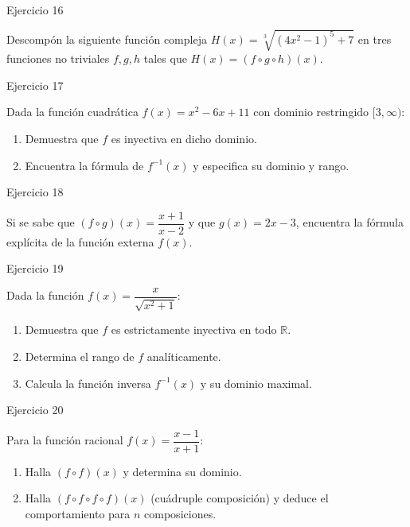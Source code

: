 \documentclass[aspectratio=169]{beamer}
\begin{document}
\begin{frame}{Ejercicio 16}
  \begin{mwejercicio}
    Descompón la siguiente función compleja $H(x) = \sqrt[3]{(4x^2 - 1)^5 + 7}$ en tres funciones no triviales $f, g, h$ tales que $H(x) = (f \circ g \circ h)(x)$.
  \end{mwejercicio}
  \vspace{3.5cm}
\end{frame}
\begin{frame}{Ejercicio 17}
  \begin{mwejercicio}
    Dada la función cuadrática $f(x) = x^2 - 6x + 11$ con dominio restringido $[3, \infty)$:
    \begin{enumerate}
      \item Demuestra que $f$ es inyectiva en dicho dominio.
      \item Encuentra la fórmula de $f^{-1}(x)$ y especifica su dominio y rango.
    \end{enumerate}
  \end{mwejercicio}
  \vspace{3.5cm}
\end{frame}
\begin{frame}{Ejercicio 18}
  \begin{mwejercicio}
    Si se sabe que $(f \circ g)(x) = \dfrac{x + 1}{x - 2}$ y que $g(x) = 2x - 3$, encuentra la fórmula explícita de la función externa $f(x)$.
  \end{mwejercicio}
  \vspace{3.5cm}
\end{frame}
\begin{frame}{Ejercicio 19}
  \begin{mwejercicio}
    Dada la función $f(x) = \dfrac{x}{\sqrt{x^2 + 1}}$:
    \begin{enumerate}
      \item Demuestra que $f$ es estrictamente inyectiva en todo $\mathbb{R}$.
      \item Determina el rango de $f$ analíticamente.
      \item Calcula la función inversa $f^{-1}(x)$ y su dominio maximal.
    \end{enumerate}
  \end{mwejercicio}
  \vspace{3.5cm}
\end{frame}
\begin{frame}{Ejercicio 20}
  \begin{mwejercicio}
    Para la función racional $f(x) = \dfrac{x - 1}{x + 1}$:
    \begin{enumerate}
      \item Halla $(f \circ f)(x)$ y determina su dominio.
      \item Halla $(f \circ f \circ f \circ f)(x)$ (cuádruple composición) y deduce el comportamiento para $n$ composiciones.
    \end{enumerate}
  \end{mwejercicio}
  \vspace{3.5cm}
\end{frame}
\end{document}
